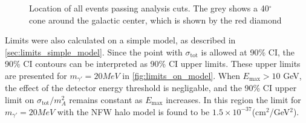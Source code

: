 \begin{figure}
	\centering
	\caption{Location of all events passing analysis cuts.  The grey shows a 40$^\circ$ cone around the galactic center, which is shown by the red diamond}
	\label{fig:skymap_all}
\end{figure}

Limits were also calculated on a simple model, as described in \cref{sec:limits_simple_model}.  Since the point with $\sigma_\textrm{tot}$ is allowed at 90\% CI, the 90\% CI contours can be interpreted as 90\% CI upper limits.  These upper limits are presented for $m_{\gamma '}=20 MeV$ in \cref{fig:limits_on_model}.  When $E_\textrm{max}>10$ GeV, the effect of the detector energy threshold is negligable, and the 90\% CI upper limit on $\sigma_{\textrm{tot}}/m_A^2$ remains constant as $E_\textrm{max}$ increases.  In this region the limit for $m_{\gamma '}=20 MeV$ with the NFW halo model is found to be $1.5 \times 10^{-37}$(cm$^2$/GeV$^2$).

